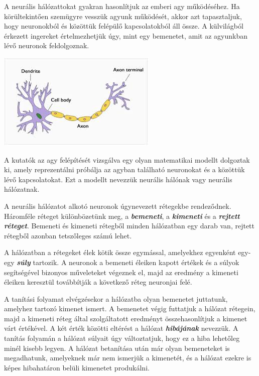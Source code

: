 
A neurális hálózattokat gyakran hasonlítjuk az emberi agy működéséhez. Ha körültekintően szemügyre vesszük agyunk működését, akkor azt tapasztaljuk, hogy neuronokból és közöttük felépülő kapcsolatokból áll össze. A külvilágból érkezett ingereket értelmezhetjük úgy, mint egy bemenetet, amit az agyunkban lévő neuronok feldolgoznak. 

\begin{center}
	\includegraphics[scale=1.0]{images/neuron.png}
\end{center}

A kutatók az agy felépítését vizsgálva egy olyan matematikai modellt dolgoztak ki, amely   reprezentálni próbálja az agyban található neuronokat és a közöttük lévő kapcsolatokat. Ezt a modellt nevezzük neurális hálónak vagy neurális hálózatnak.  

A neurális hálózatot alkotó neuronok úgynevezett rétegekbe rendeződnek. Háromféle réteget különbözetünk meg, a \textbf{\textit{bemeneti}}, a \textbf{\textit{kimeneti}} és a \textbf{\textit{rejtett réteget}}. Bemeneti és kimeneti rétegből minden hálózatban egy darab van, rejtett rétegből azonban tetszőleges számú lehet. 

A hálózatban a rétegeket élek kötik össze egymással, amelyekhez egyenként egy-egy \textbf{\textit{súly}} tartozik. A neuronok a bemeneti éleiken kapott értékek és a súlyok segítségével bizonyos műveleteket végeznek el, majd az eredmény a kimeneti éleiken keresztül továbbítják a következő réteg neuronjai felé. 

A tanítási folyamat elvégzésekor a hálózatba olyan bemenetet juttatunk, amelyhez tartozó kimenet ismert. A bemenetet végig futtatjuk a hálózat rétegein, majd a kimeneti réteg által szolgáltatott eredményt összehasonlítjuk a kimenet várt értékével. A két érték közötti eltérést a hálózat \textit{\textbf{hibájának}} nevezzük. A tanítás folyamán a hálózat súlyait úgy változtatjuk, hogy ez a hiba lehetőleg minél kisebb legyen. A hálózat betanítása után már olyan bemeneteket is megadhatunk, amelyeknek már nem ismerjük a kimenetét, és a hálózat ezekre is képes hibahatáron belüli kimenetet produkálni.\\

